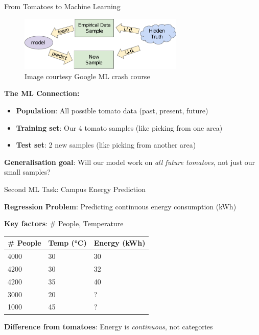 \documentclass[usenames,dvipsnames]{beamer}
\begin{document}
\begin{frame}{From Tomatoes to Machine Learning}
\begin{figure}
	\centering
	\includegraphics[width=0.7\textwidth]{../assets/accuracy-convention/diagrams/train-test.pdf}
	\caption{Image courtesy Google ML crash course}
	\label{fig:train-test}
\end{figure}

\pause \textbf{The ML Connection:}
\begin{itemize}
	\item \textbf{Population}: All possible tomato data (past, present, future)
	\item \pause \textbf{Training set}: Our 4 tomato samples (like picking from one area)
	\item \pause \textbf{Test set}: 2 new samples (like picking from another area)
\end{itemize}

\pause \textbf{Generalisation goal}: Will our model work on \textit{all future tomatoes}, not just our small samples?
\end{frame}

\begin{frame}{Second ML Task: Campus Energy Prediction}

\textbf{Regression Problem}: Predicting continuous energy consumption (kWh)

\textbf{Key factors}: \# People, Temperature

\begin{table}[]
	\begin{tabular}{|l|l||l|}
		\hline 
		\textbf{\# People} & \textbf{Temp (°C)} &  \textbf{Energy (kWh)} \\ \hline 
		4000 & 30 & 30 \\
		4200 & 30 & 32 \\
		4200 & 35 & 40 \\ \hline
		3000 & 20& ? \\
		1000 & 45 & ? \\ \hline          
	\end{tabular}
\end{table}	

\pause \textbf{Difference from tomatoes}: Energy is \textit{continuous}, not categories
\end{frame}
\end{document}

